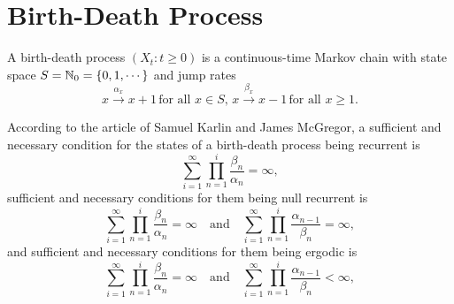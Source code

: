 \section{Birth-Death Process}


A birth-death process $(X_t: t \ge 0)$ is a continuous-time Markov chain with state space $S = \mathbb{N}_0 = \{0, 1, \cdots\}$ and jump rates 
$$
x \xrightarrow{\alpha_x} x + 1 \, \text{for all $x \in S$, } x \xrightarrow{\beta_x} x - 1 \, \text{for all $x \ge 1$.}
$$

According to the article \cite{karlin1957classification} of Samuel Karlin and James McGregor, a sufficient and necessary condition for the states of a birth-death process being recurrent is 
\begin{equation}\label{recurrent}
    \sum_{i=1}^\infty \prod_{n=1}^i \frac{\beta_n}{\alpha_n} = \infty,
\end{equation}
sufficient and necessary conditions for them being null recurrent is 
\begin{equation}\label{null recurrent}
    \sum_{i=1}^\infty \prod_{n=1}^i \frac{\beta_n}{\alpha_n} = \infty \quad \text{and} \quad
    \sum_{i=1}^\infty \prod_{n=1}^i \frac{\alpha_{n-1}}{\beta_n} = \infty,
\end{equation}
and sufficient and necessary conditions for them being ergodic is 
\begin{equation}\label{ergodic}
    \sum_{i=1}^\infty \prod_{n=1}^i \frac{\beta_n}{\alpha_n} = \infty \quad \text{and} \quad
    \sum_{i=1}^\infty \prod_{n=1}^i \frac{\alpha_{n-1}}{\beta_n} < \infty,
\end{equation}

